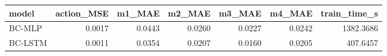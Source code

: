 \begin{tabular}{lrrrrrr}
\toprule
model & action_MSE & m1_MAE & m2_MAE & m3_MAE & m4_MAE & train_time_s \\
\midrule
BC-MLP & 0.0017 & 0.0443 & 0.0260 & 0.0227 & 0.0242 & 1382.3686 \\
BC-LSTM & 0.0011 & 0.0354 & 0.0207 & 0.0160 & 0.0205 & 407.6457 \\
\bottomrule
\end{tabular}
